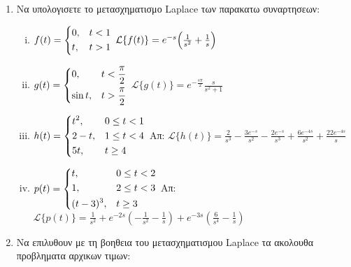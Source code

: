 \begin{enumerate}
\begin{enumerate}[i)]
\end{enumerate}

\item Να υπολογισετε το μετασχηματισμο \textlatin{Laplace} των παρακατω συναρτησεων:

\begin{enumerate}[i)]

\item $f(t)=\begin{dcases} 0, & t<1 \\ t, & t>1 \end{dcases}$ \hfill
$\mathcal{L}\{f(t)\}=e^{-s}\Bigl(\frac{1}{s^2}+\frac{1}{s}\Bigr)$

\item $g(t)=\begin{dcases} 0, & t<\frac{\pi}{2} \\ \sin t, & t>\frac{\pi}{2} \end{dcases}$ \hfill $\mathcal{L}\{g(t)\}=e^{-\frac{s\pi}{2}}\frac{s}{s^2+1}$

\item $h(t)=\begin{dcases} t^{2}, & 0\leq t<1 \\ 2-t, & 1\leq t < 4 \\
5t, & t\geq 4
\end{dcases}$ \hfill Απ: $\mathcal{L}\{h(t)\}=\frac{2}{s^{3}}-\frac{3e^{-s}}{s^{2}}-\frac{2e^{-s}}{s^{3}}+\frac{6e^{-4s}}{s^{2}}+\frac{22e^{-4s}}{s}$

\item $p(t)=\begin{dcases} t, & 0\leq t< 2 \\ 1, & 2\leq t < 3 \\
(t-3)^{3}, & t\geq 3
\end{dcases}$ \hfill Απ: $\mathcal{L}\{p(t)\}=\frac{1}{s^{2}}+e^{-2s}\left(-\frac{1}{s^{2}}-\frac{1}{s}\right)+e^{-3s}\left(\frac{6}{s^{4}}-\frac{1}{s}\right)$
\end{enumerate}

\item Να επιλυθουν με τη βοηθεια του μετασχηματισμου \textlatin{Laplace} τα ακολουθα προβληματα αρχικων τιμων:

\begin{enumerate}[i)]


\end{enumerate}
\end{enumerate}
